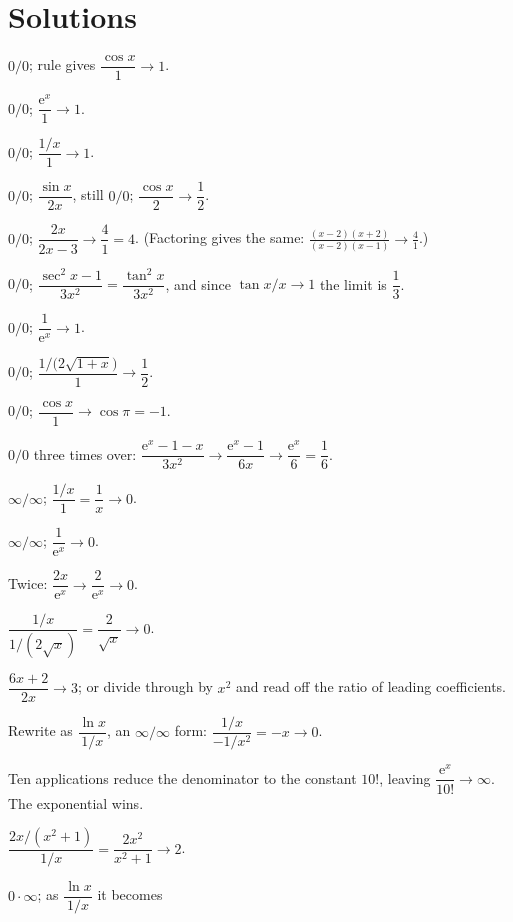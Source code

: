 \section{Solutions}

\begin{solutions}
  \item $0/0$; rule gives $\dfrac{\cos x}{1}\to1$.
  \item $0/0$; $\dfrac{\mathrm{e}^{x}}{1}\to1$.
  \item $0/0$; $\dfrac{1/x}{1}\to1$.
  \item $0/0$; $\dfrac{\sin x}{2x}$, still $0/0$;
        $\dfrac{\cos x}{2}\to\dfrac12$.
  \item $0/0$; $\dfrac{2x}{2x-3}\to\dfrac{4}{1}=4$. (Factoring gives the
        same: $\frac{(x-2)(x+2)}{(x-2)(x-1)}\to\frac{4}{1}$.)
  \item $0/0$; $\dfrac{\sec^{2}x-1}{3x^{2}}=\dfrac{\tan^{2}x}{3x^{2}}$,
        and since $\tan x/x\to1$ the limit is $\dfrac13$.
  \item $0/0$; $\dfrac{1}{\mathrm{e}^{x}}\to1$.
  \item $0/0$;
        $\dfrac{1/\bigl(2\sqrt{1+x}\bigr)}{1}\to\dfrac12$.
  \item $0/0$; $\dfrac{\cos x}{1}\to\cos\pi=-1$.
  \item $0/0$ three times over:
        $\dfrac{\mathrm{e}^{x}-1-x}{3x^{2}}\to
        \dfrac{\mathrm{e}^{x}-1}{6x}\to
        \dfrac{\mathrm{e}^{x}}{6}=\dfrac16$.
  \item $\infty/\infty$; $\dfrac{1/x}{1}=\dfrac1x\to0$.
  \item $\infty/\infty$; $\dfrac{1}{\mathrm{e}^{x}}\to0$.
  \item Twice: $\dfrac{2x}{\mathrm{e}^{x}}\to
        \dfrac{2}{\mathrm{e}^{x}}\to0$.
  \item $\dfrac{1/x}{1/(2\sqrt{x})}=\dfrac{2}{\sqrt{x}}\to0$.
  \item $\dfrac{6x+2}{2x}\to3$; or divide through by $x^{2}$ and read off
        the ratio of leading coefficients.
  \item Rewrite as $\dfrac{\ln x}{1/x}$, an $\infty/\infty$ form:
        $\dfrac{1/x}{-1/x^{2}}=-x\to0$.
  \item Ten applications reduce the denominator to the constant $10!$,
        leaving $\dfrac{\mathrm{e}^{x}}{10!}\to\infty$. The exponential
        wins.
  \item $\dfrac{2x/(x^{2}+1)}{1/x}=\dfrac{2x^{2}}{x^{2}+1}\to2$.
  \item $0\cdot\infty$; as $\dfrac{\ln x}{1/x}$ it becomes

\end{solutions}
